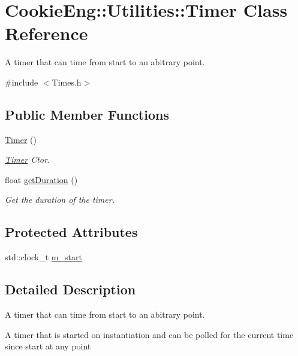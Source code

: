 \hypertarget{class_cookie_eng_1_1_utilities_1_1_timer}{}\section{Cookie\+Eng\+:\+:Utilities\+:\+:Timer Class Reference}
\label{class_cookie_eng_1_1_utilities_1_1_timer}


A timer that can time from start to an abitrary point.  




{\ttfamily \#include $<$Times.\+h$>$}

\subsection*{Public Member Functions}
\begin{DoxyCompactItemize}
\item 
\hyperlink{class_cookie_eng_1_1_utilities_1_1_timer_a28cc053b28408f6ea3b0a2321a601ba2}{Timer} ()
\begin{DoxyCompactList}\small\item\em \hyperlink{class_cookie_eng_1_1_utilities_1_1_timer}{Timer} Ctor. \end{DoxyCompactList}\item 
float \hyperlink{class_cookie_eng_1_1_utilities_1_1_timer_ac3fb7af2d92ceca6631fa68ea59323b8}{get\+Duration} ()
\begin{DoxyCompactList}\small\item\em Get the duration of the timer. \end{DoxyCompactList}\end{DoxyCompactItemize}
\subsection*{Protected Attributes}
\begin{DoxyCompactItemize}
\item 
std\+::clock\+\_\+t \hyperlink{class_cookie_eng_1_1_utilities_1_1_timer_a49ae24086217a500de80980bb6e9c121}{m\+\_\+start}
\end{DoxyCompactItemize}


\subsection{Detailed Description}
A timer that can time from start to an abitrary point. 

A timer that is started on instantiation and can be polled for the current time since start at any point 

